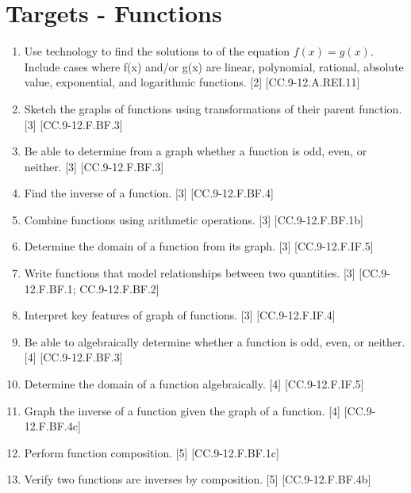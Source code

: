 \documentclass{article}
\begin{document}
\section{Targets - Functions}
\begin{enumerate}
	\item Use technology to find the solutions to of the equation $f(x) = g(x)$. Include cases where f(x) and/or g(x) are linear, polynomial, rational, absolute value, exponential, and logarithmic functions. [2] [CC.9-12.A.REI.11]
	\item Sketch the graphs of functions using transformations of their parent function. [3] [CC.9-12.F.BF.3]
	\item Be able to determine from a graph whether a function is odd, even, or neither. [3] [CC.9-12.F.BF.3]
	\item Find the inverse of a function. [3] [CC.9-12.F.BF.4]
	\item Combine functions using arithmetic operations. [3] [CC.9-12.F.BF.1b]
	\item Determine the domain of a function from its graph. [3] [CC.9-12.F.IF.5]
	\item Write functions that model relationships between two quantities. [3] [CC.9-12.F.BF.1; CC.9-12.F.BF.2]
	\item Interpret key features of graph of functions. [3] [CC.9-12.F.IF.4]
	\item Be able to algebraically determine whether a function is odd, even, or neither. [4] [CC.9-12.F.BF.3]
	\item Determine the domain of a function algebraically. [4] [CC.9-12.F.IF.5]
	\item Graph the inverse of a function given the graph of a function. [4] [CC.9-12.F.BF.4c]
	\item Perform function composition. [5] [CC.9-12.F.BF.1c]
	\item Verify two functions are inverses by composition. [5] [CC.9-12.F.BF.4b]
\end{enumerate}
\newpage
\end{document}

